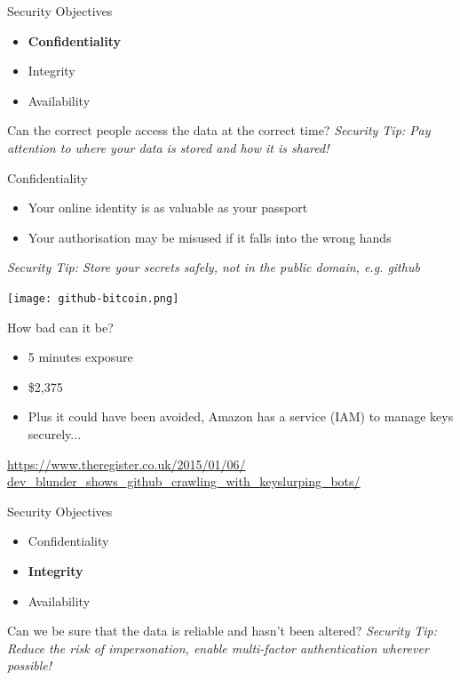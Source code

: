 \documentclass[aspectratio=169]{beamer}
\begin{document}
\begin{frame}{Security Objectives}
	\begin{itemize}
		\item \textbf{Confidentiality}
		\item Integrity
        \item Availability
	\end{itemize}
    Can the correct people access the data at the correct time?
	\linebreak
    \linebreak
    { \color{red} \textit{Security Tip: Pay attention to where your data is stored and how it is shared!} }
\end{frame}

\begin{frame}{Confidentiality}
\begin{itemize}
\item Your online identity is as valuable as your passport 
\item Your authorisation may be misused if it falls into the wrong hands
\end{itemize}
{ \color{red} \textit{Security Tip: Store your secrets safely, not in the public domain, e.g. github} }
\end{frame}

\begin{frame}{}
\begin{center}
\texttt{[image: github-bitcoin.png]}
\end{center}
\end{frame}

\begin{frame}{How bad can it be?}
\begin{itemize}
\item 5 minutes exposure
\item \$2,375
\item Plus it could have been avoided, Amazon has a service (IAM) to manage keys securely...
\end{itemize}
{\small \url{https://www.theregister.co.uk/2015/01/06/ dev_blunder_shows_github_crawling_with_keyslurping_bots/} \par}
\end{frame}

\begin{frame}{Security Objectives}
	\begin{itemize}
		\item Confidentiality
		\item \textbf{Integrity}
        \item Availability
	\end{itemize}
    Can we be sure that the data is reliable and hasn't been altered?
	\linebreak
    \linebreak
    { \color{red} \textit{Security Tip: Reduce the risk of impersonation, enable multi-factor authentication wherever possible!} }
\end{frame}
\end{document}
